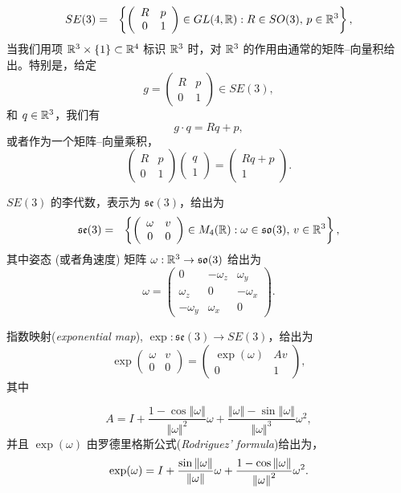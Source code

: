 \documentclass[11pt,fontset=founder]{ctexart}
\begin{document}
\[
SE(3)=\ \ \left\{ \left(
\begin{array}{cc}
R & p \\
0 & 1
\end{array}
\right) \in GL(4,\Bbb{R}):R\in SO(3),\,p\in \Bbb{R}^{3}\right\} ,
\]
当我们用项 $\Bbb{R}^{3}\times
\{1\}\subset \Bbb{R}^{4}$ 标识 $\Bbb{R}^{3}$ 时，对 $\Bbb{R}^{3}$ 的作用由通常的矩阵–向量积给出。特别是，给定
\[
g=\left(
\begin{array}{cc}
R & p \\
0 & 1
\end{array}
\right) \in SE(3),
\]
和 $q\in \Bbb{R}^{3}$，我们有
\[
g\cdot q=Rq+p,
\]
或者作为一个矩阵–向量乘积，
\[
\left(
\begin{array}{cc}
R & p \\
0 & 1
\end{array}
\right) \left(
\begin{array}{c}
q \\
1
\end{array}
\right) =\left(
\begin{array}{c}
Rq+p \\
1
\end{array}
\right) .
\]

$SE(3)$ 的李代数，表示为 $\mathfrak{se}(3)$，给出为 \
\[
\mathfrak{se}(3)=\ \ \left\{ \left(
\begin{array}{cc}
\omega & v \\
0 & 0
\end{array}
\right) \in M_{4}(\Bbb{R}):\omega\in \mathfrak{so}(3),\,v\in \Bbb{R}%
^{3}\right\} ,
\]
其中姿态 (或者角速度) 矩阵 $\omega:\Bbb{R}%
^{3}\rightarrow \mathfrak{so}(3)$ 给出为
\[
\omega=\left(
\begin{array}{ccc}
0 & -\omega _{z} & \omega _{y} \\
\omega _{z} & 0 & -\omega _{x} \\
-\omega _{y} & \omega _{x} & 0
\end{array}
\right) .
\]

指数映射(\emph{exponential map}), $\exp :\mathfrak{se}(3)\rightarrow
SE(3)$，给出为
\[
\exp \left(
\begin{array}{cc}
\omega & v \\
0 & 0
\end{array}
\right) =\left(
\begin{array}{cc}
\exp (\omega) & Av \\
0 & 1
\end{array}
\right) ,
\]
其中

\[
A=I+\frac{1-\cos \left\Vert \omega \right\Vert }{\left\Vert \omega
\right\Vert ^{2}}\omega+\frac{\left\Vert \omega \right\Vert -\sin
\left\Vert \omega \right\Vert }{\left\Vert \omega \right\Vert
^{3}} \omega^{2},
\]
并且 $\exp (\omega)$ 由罗德里格斯公式(\emph{Rodriguez' formula})给出为，
\[
\exp (\omega)=I+\frac{\sin \left\Vert \omega \right\Vert }{%
\left\Vert \omega \right\Vert }\omega+\frac{1-\cos \left\Vert
\omega \right\Vert }{\left\Vert \omega \right\Vert
^{2}}\omega^{2}.
\]
\end{document}
